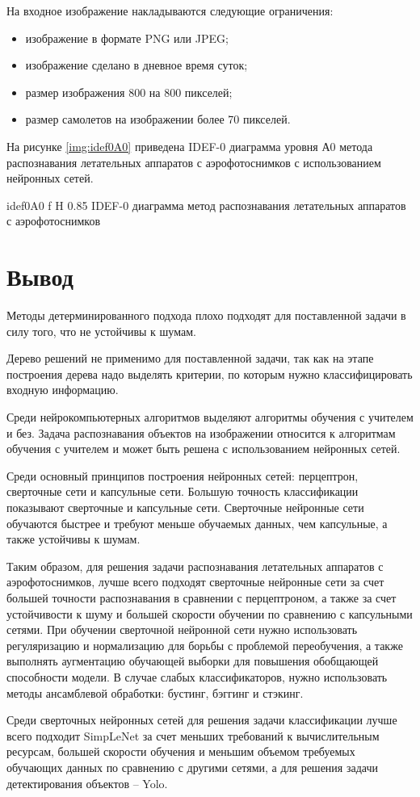 На входное изображение накладываются следующие ограничения:
\begin{itemize}
	\item изображение в формате PNG или JPEG;
	\item изображение сделано в дневное время суток;
	\item размер изображения 800 на 800 пикселей;
	\item размер самолетов на изображении более 70 пикселей.
\end{itemize}

На рисунке \ref{img:idef0A0} приведена IDEF-0 диаграмма уровня А0 метода распознавания летательных аппаратов с аэрофотоснимков с использованием нейронных сетей.

{idef0A0} %
{f} %
{H} %
{0.85\textwidth} %
{IDEF-0 диаграмма метод распознавания летательных аппаратов с аэрофотоснимков} %

\section{Вывод}

Методы детерминированного подхода плохо подходят для поставленной задачи в силу того, что не устойчивы к шумам.

Дерево решений не применимо для поставленной задачи, так как на этапе построения дерева надо выделять критерии, по которым нужно классифицировать входную информацию.

Среди нейрокомпьютерных алгоритмов выделяют алгоритмы обучения с учителем и без. Задача распознавания объектов на изображении относится к алгоритмам обучения с учителем и может быть решена с использованием нейронных сетей.

Среди основный принципов построения нейронных сетей: перцептрон, сверточные сети и капсульные сети. Большую точность классификации показывают сверточные и капсульные сети. Сверточные нейронные сети обучаются быстрее и требуют меньше обучаемых данных, чем капсульные, а также устойчивы к шумам.

Таким образом, для решения задачи распознавания летательных аппаратов с аэрофотоснимков, лучше всего подходят сверточные нейронные сети за счет большей точности распознавания в сравнении с перцептроном, а также за счет устойчивости к шуму и большей скорости обучении по сравнению с капсульными сетями. При обучении сверточной нейронной сети нужно использовать регуляризацию и нормализацию для борьбы с проблемой переобучения, а также выполнять аугментацию обучающей выборки для повышения обобщающей способности модели. В случае слабых классификаторов, нужно использовать методы ансамблевой обработки: бустинг, бэггинг и стэкинг.

Среди сверточных нейронных сетей для решения задачи классификации лучше всего подходит SimpLeNet за счет меньших требований к вычислительным ресурсам, большей скорости обучения и меньшим объемом требуемых обучающих данных по сравнению с другими сетями, а для решения задачи детектирования объектов -- Yolo.